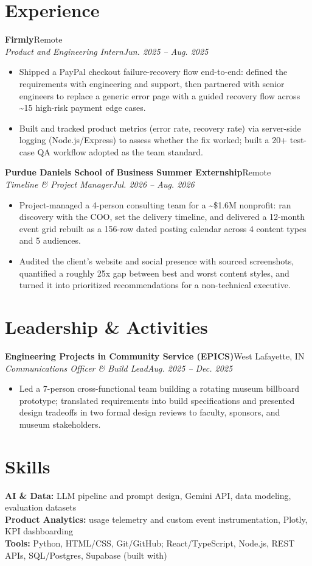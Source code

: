 \documentclass[10pt,letterpaper]{article}
\newcommand{\entry}[4]{%
  \textbf{#1}\hfill #2\\[1pt]
  \textit{#3}\hfill \textit{#4}\\[2pt]
}
\begin{document}
\section*{Experience}
\entry{Firmly}{Remote}{Product and Engineering Intern}{Jun. 2025 -- Aug. 2025}
\begin{itemize}
  \item Shipped a PayPal checkout failure-recovery flow end-to-end: defined the requirements with engineering and support, then partnered with senior engineers to replace a generic error page with a guided recovery flow across \textasciitilde15 high-risk payment edge cases.
  \item Built and tracked product metrics (error rate, recovery rate) via server-side logging (Node.js/Express) to assess whether the fix worked; built a 20+ test-case QA workflow adopted as the team standard.
\end{itemize}

\entry{Purdue Daniels School of Business Summer Externship}{Remote}{Timeline \& Project Manager}{Jul. 2026 -- Aug. 2026}
\begin{itemize}
  \item Project-managed a 4-person consulting team for a \textasciitilde\$1.6M nonprofit: ran discovery with the COO, set the delivery timeline, and delivered a 12-month event grid rebuilt as a 156-row dated posting calendar across 4 content types and 5 audiences.
  \item Audited the client's website and social presence with sourced screenshots, quantified a roughly 25x gap between best and worst content styles, and turned it into prioritized recommendations for a non-technical executive.
\end{itemize}

\section*{Leadership \& Activities}
\entry{Engineering Projects in Community Service (EPICS)}{West Lafayette, IN}{Communications Officer \& Build Lead}{Aug. 2025 -- Dec. 2025}
\begin{itemize}
  \item Led a 7-person cross-functional team building a rotating museum billboard prototype; translated requirements into build specifications and presented design tradeoffs in two formal design reviews to faculty, sponsors, and museum stakeholders.
\end{itemize}

\section*{Skills}
\textbf{AI \& Data:} LLM pipeline and prompt design, Gemini API, data modeling, evaluation datasets\\[2pt]
\textbf{Product Analytics:} usage telemetry and custom event instrumentation, Plotly, KPI dashboarding\\[2pt]
\textbf{Tools:} Python, HTML/CSS, Git/GitHub; React/TypeScript, Node.js, REST APIs, SQL/Postgres, Supabase (built with)
\end{document}
